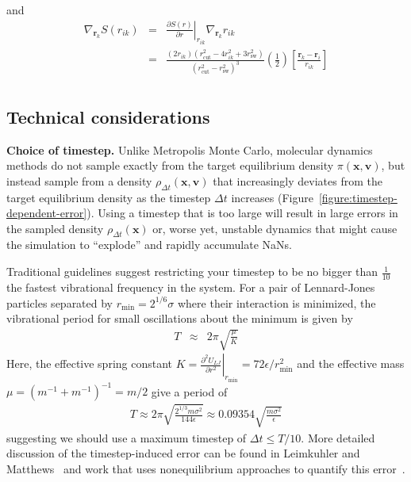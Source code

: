 \documentclass[aip,jcp,preprint,superscriptaddress,floatfix]{revtex4-1}
\newcommand{\x}{\mathbf{x}}
\newcommand{\vel}{\mathbf{v}}
\begin{document}
and
\begin{eqnarray}
\nabla_{\mathbf{r}_k} S(r_{ik}) &=& \left. \frac{\partial S(r)}{\partial r} \right|_{r_{ik}} \nabla_{\mathbf{r}_k} r_{ik}  \\
&=&\frac{(2 r_{ik}) (r_\mathrm{cut}^2 -4 r_{ik}^2 + 3 r_\mathrm{sw}^2)}{(r_\mathrm{cut}^2 - r_\mathrm{sw}^2)^3} \left( \frac{1}{2}\right) \left[ \frac{\mathbf{r}_k - \mathbf{r}_i}{r_{ik}} \right] \\
\end{eqnarray}

\subsection{Technical considerations}


\textbf{Choice of timestep.} 
Unlike Metropolis Monte Carlo, molecular dynamics methods do not sample exactly from the target equilibrium density $\pi(\x,\vel)$, but instead sample from a density $\rho_{\Delta t}(\x,\vel)$ that increasingly deviates from the target equilibrium density as the timestep $\Delta t$ increases (Figure~\ref{figure:timestep-dependent-error}).
Using a timestep that is too large will result in large errors in the sampled density $\rho_{\Delta t}(\x)$ or, worse yet, unstable dynamics that might cause the simulation to ``explode''  and rapidly accumulate NaNs.

Traditional guidelines suggest restricting your timestep to be no bigger than $\frac{1}{10}$ the fastest vibrational frequency in the system.
For a pair of Lennard-Jones particles separated by $r_\mathrm{min} = 2^{1/6} \sigma$ where their interaction is minimized, the vibrational period for small oscillations about the minimum is given by
\begin{eqnarray}
T &\approx& 2 \pi \sqrt{ \frac{\mu}{K} } 
\end{eqnarray}
Here, the effective spring constant $K = \left. \frac{\partial^2 U_{LJ}}{\partial r^2} \right|_{r_\mathrm{min}} = 72 \epsilon / r_\mathrm{min}^2$ and the effective mass $\mu = (m^{-1} + m^{-1})^{-1} = m/2$ give a period of 
\begin{eqnarray}
T \approx 2 \pi \sqrt{\frac{2^{1/3} m \sigma^2}{144 \epsilon}} \approx 0.09354 \sqrt{\frac{m \sigma^2}{\epsilon}}
\end{eqnarray}
suggesting we should use a maximum timestep of $\Delta t \le T/10$.
More detailed discussion of the timestep-induced error can be found in Leimkuhler and Matthews~\cite{LeimkuhlerMatthewsBook} and work that uses nonequilibrium approaches to quantify this error~\cite{VVVR}.
\end{document}
